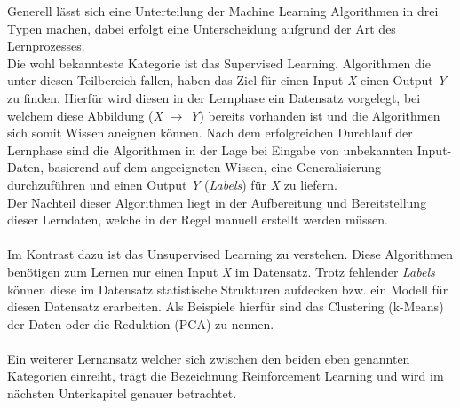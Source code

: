 Generell lässt sich eine Unterteilung der Machine Learning Algorithmen in drei Typen machen, dabei erfolgt eine Unterscheidung aufgrund der Art des Lernprozesses. \\
Die wohl bekannteste Kategorie ist das Supervised Learning. Algorithmen die unter diesen Teilbereich fallen, haben das Ziel für einen Input \textit{X} einen Output \textit{Y} zu finden. Hierfür wird diesen in der Lernphase ein Datensatz vorgelegt, bei welchem diese Abbildung (\textit{X} $\rightarrow$ \textit{Y}) bereits vorhanden ist und die Algorithmen sich somit Wissen aneignen können. Nach dem erfolgreichen Durchlauf der Lernphase sind die Algorithmen in der Lage bei Eingabe von unbekannten Input-Daten, basierend auf dem angeeigneten Wissen, eine Generalisierung durchzuführen und einen Output \textit{Y} (\textit{Labels}) für \textit{X} zu liefern. \\
Der Nachteil dieser Algorithmen liegt in der Aufbereitung und Bereitstellung dieser Lerndaten, welche in der Regel manuell erstellt werden müssen. \cite{Engemann}\\\\
Im Kontrast dazu ist das Unsupervised Learning zu verstehen. Diese Algorithmen benötigen zum Lernen nur einen Input \textit{X} im Datensatz. Trotz fehlender \textit{Labels} können diese im Datensatz statistische Strukturen aufdecken bzw. ein Modell für diesen Datensatz erarbeiten. Als Beispiele hierfür sind das Clustering (k-Means) der Daten oder die Reduktion (PCA) zu nennen. \cite{Engemann,mlmitchel, Sutton}\\\\
Ein weiterer Lernansatz welcher sich zwischen den beiden eben genannten Kategorien einreiht, trägt die Bezeichnung Reinforcement Learning und wird im nächsten Unterkapitel genauer betrachtet.


